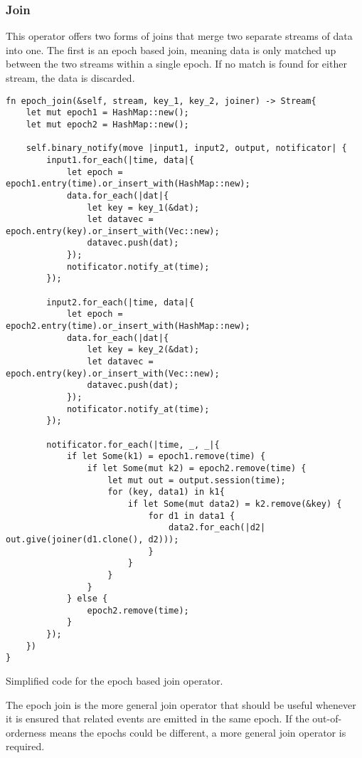 \subsubsection{Join}
This operator offers two forms of joins that merge two separate streams of data into one. The first is an epoch based join, meaning data is only matched up between the two streams within a single epoch. If no match is found for either stream, the data is discarded.

\begin{listing}[H]
\begin{verbatim}
fn epoch_join(&self, stream, key_1, key_2, joiner) -> Stream{
    let mut epoch1 = HashMap::new();
    let mut epoch2 = HashMap::new();
    
    self.binary_notify(move |input1, input2, output, notificator| {
        input1.for_each(|time, data|{
            let epoch = epoch1.entry(time).or_insert_with(HashMap::new);
            data.for_each(|dat|{
                let key = key_1(&dat);
                let datavec = epoch.entry(key).or_insert_with(Vec::new);
                datavec.push(dat);
            });
            notificator.notify_at(time);
        });
        
        input2.for_each(|time, data|{
            let epoch = epoch2.entry(time).or_insert_with(HashMap::new);
            data.for_each(|dat|{
                let key = key_2(&dat);
                let datavec = epoch.entry(key).or_insert_with(Vec::new);
                datavec.push(dat);
            });
            notificator.notify_at(time);
        });
        
        notificator.for_each(|time, _, _|{
            if let Some(k1) = epoch1.remove(time) {
                if let Some(mut k2) = epoch2.remove(time) {
                    let mut out = output.session(time);
                    for (key, data1) in k1{
                        if let Some(mut data2) = k2.remove(&key) {
                            for d1 in data1 {
                                data2.for_each(|d2| out.give(joiner(d1.clone(), d2)));
                            }
                        }
                    }
                }
            } else {
                epoch2.remove(time);
            }
        });
    })
}
\end{verbatim}
  \caption{Simplified code for the epoch based join operator.}
  \label{lst:epoch-join}
\end{listing}

The epoch join is the more general join operator that should be useful whenever it is ensured that related events are emitted in the same epoch. If the out-of-orderness means the epochs could be different, a more general join operator is required.

